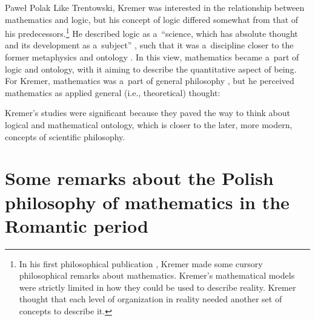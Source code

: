 \begin{artengenv}{Paweł Polak}
Like Trentowski, Kremer was interested in the relationship between mathematics and logic, but his concept of logic differed somewhat from that of his predecessors.\footnote{In his first philosophical publication
\parencites[][]{kremer_rys_1835}[][]{kremer_rys_1835-1}, %
 Kremer made some cursory philosophical remarks about mathematics. Kremer's mathematical models were strictly limited in how they could be used to describe reality. Kremer thought that each level of organization in reality needed another set of concepts to describe it.} He described logic as a~``science, which has absolute thought and its development as a~subject'' 
\parencite[][p.112]{kremer_wyklad_1849}, %
 such that it was a~discipline closer to the former metaphysics and ontology 
\parencite[][p.114]{kremer_wyklad_1849}. %
 In this view, mathematics became a~part of logic and ontology, with it aiming to describe the quantitative aspect of being. For Kremer, mathematics was a~part of general philosophy 
\parencite[][p.9]{kremer_wyklad_1849}, %
 but he perceived mathematics as applied general (i.e., theoretical) thought:

Kremer's studies were significant because they paved the way to think about logical and mathematical ontology, which is closer to the later, more modern, concepts of scientific philosophy.

\section*{Some remarks about the Polish philosophy of mathematics in the Romantic period}


\end{artengenv}
